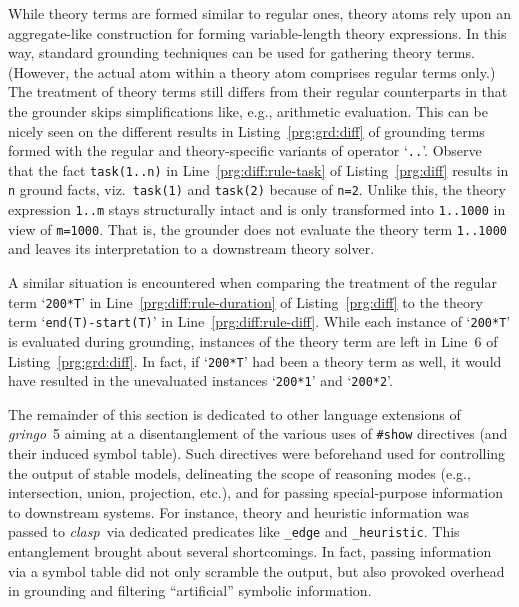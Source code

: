 \documentclass[a4paper,USenglish]{oasics-v2016}
\newcommand{\sysfont}{\textit}
\newcommand{\clasp}{\sysfont{clasp}}
\newcommand{\gringo}{\sysfont{gringo}}
\begin{document}
While theory terms are formed similar to regular ones,
theory atoms rely upon an aggregate-like construction for forming variable-length theory expressions.
In this way, standard grounding techniques can be used for gathering theory terms.
(However, the actual atom within a theory atom comprises regular terms only.)
%
The treatment of theory terms still %
differs from their regular counterparts
%
in that the grounder skips simplifications like, e.g., arithmetic evaluation.
%
This can be nicely seen on the different results in Listing~\ref{prg:grd:diff} of grounding terms formed with
the regular and theory-specific variants of operator `\lstinline{..}'.
Observe that
the     fact \lstinline{task(1..n)} in Line~\ref{prg:diff:rule-task} of Listing~\ref{prg:diff} results in \lstinline{n} ground     facts,
viz.\ \lstinline{task(1)} and \lstinline{task(2)} because of \lstinline{n=2}.
Unlike this, the theory expression \lstinline{1..m} stays structurally intact and is only transformed into \lstinline{1..1000} in view of \lstinline{m=1000}.
That is, the grounder does not evaluate the theory term \lstinline{1..1000} and
leaves its interpretation to a downstream theory solver.
%

%
%
A similar situation is encountered when comparing the treatment of the regular term `\lstinline{200*T}' in Line~\ref{prg:diff:rule-duration} of Listing~\ref{prg:diff} to the
theory term `\lstinline{end(T)-start(T)}' in Line~\ref{prg:diff:rule-diff}.
While each instance of `\lstinline{200*T}' is evaluated during grounding,
instances of the theory term  are left in Line~6 of Listing~\ref{prg:grd:diff}.
In fact, if `\lstinline{200*T}' had been a theory term as well,
it would have resulted in the unevaluated instances  `\lstinline{200*1}' and `\lstinline{200*2}'. %


The remainder of this section is dedicated to other language extensions of \gringo~5 aiming
at a disentanglement of the various uses of \lstinline{#show} directives
(and their induced symbol table).
Such directives were beforehand used for
controlling the output of stable models,
delineating the scope of reasoning modes (e.g., intersection, union, projection, etc.),
and for
passing special-purpose information to downstream systems.
For instance,
theory and heuristic information was passed to \clasp\ via dedicated predicates like \lstinline{_edge} and \lstinline{_heuristic}.
This entanglement brought about several shortcomings.
%
In fact, passing information via a symbol table did not only scramble the output, but also provoked overhead in grounding and filtering ``artificial'' symbolic information.
\end{document}
